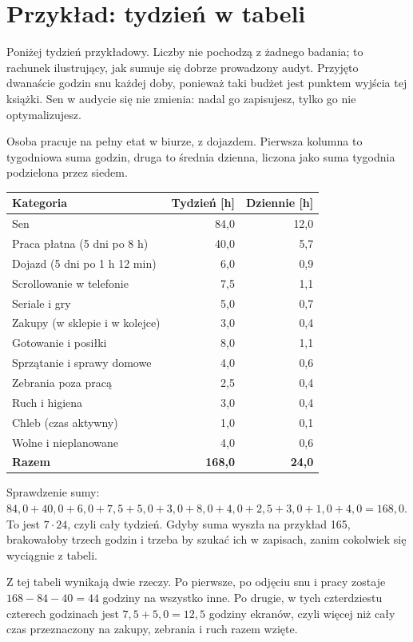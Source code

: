\section{Przykład: tydzień w tabeli}

Poniżej tydzień przykładowy. Liczby nie pochodzą z żadnego badania; to rachunek ilustrujący, jak sumuje się dobrze prowadzony audyt. Przyjęto dwanaście godzin snu każdej doby, ponieważ taki budżet jest punktem wyjścia tej książki. Sen w audycie się nie zmienia: nadal go zapisujesz, tylko go nie optymalizujesz.

\begin{przyklad}
Osoba pracuje na pełny etat w biurze, z dojazdem. Pierwsza kolumna to tygodniowa suma godzin, druga to średnia dzienna, liczona jako suma tygodnia podzielona przez siedem.

\begin{center}\small
\begin{tabular}{@{}lrr@{}}
\toprule
\textbf{Kategoria} & \textbf{Tydzień [h]} & \textbf{Dziennie [h]}\\
\midrule
Sen & 84,0 & 12,0\\
Praca płatna (5 dni po 8 h) & 40,0 & 5,7\\
Dojazd (5 dni po 1 h 12 min) & 6,0 & 0,9\\
Scrollowanie w telefonie & 7,5 & 1,1\\
Seriale i gry & 5,0 & 0,7\\
Zakupy (w sklepie i w kolejce) & 3,0 & 0,4\\
Gotowanie i posiłki & 8,0 & 1,1\\
Sprzątanie i sprawy domowe & 4,0 & 0,6\\
Zebrania poza pracą & 2,5 & 0,4\\
Ruch i higiena & 3,0 & 0,4\\
Chleb (czas aktywny) & 1,0 & 0,1\\
Wolne i nieplanowane & 4,0 & 0,6\\
\midrule
\textbf{Razem} & \textbf{168,0} & \textbf{24,0}\\
\bottomrule
\end{tabular}
\end{center}

Sprawdzenie sumy: $84{,}0 + 40{,}0 + 6{,}0 + 7{,}5 + 5{,}0 + 3{,}0 + 8{,}0 + 4{,}0 + 2{,}5 + 3{,}0 + 1{,}0 + 4{,}0 = 168{,}0$. To jest $7 \cdot 24$, czyli cały tydzień. Gdyby suma wyszła na przykład 165, brakowałoby trzech godzin i trzeba by szukać ich w zapisach, zanim cokolwiek się wyciągnie z tabeli.

Z tej tabeli wynikają dwie rzeczy. Po pierwsze, po odjęciu snu i pracy zostaje $168 - 84 - 40 = 44$ godziny na wszystko inne. Po drugie, w tych czterdziestu czterech godzinach jest $7{,}5 + 5{,}0 = 12{,}5$ godziny ekranów, czyli więcej niż cały czas przeznaczony na zakupy, zebrania i ruch razem wzięte.
\end{przyklad}

